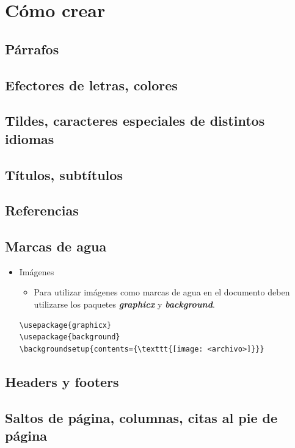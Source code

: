 \documentclass[10pt,journal,compsoc]{IEEEtran}
\begin{document}
\renewcommand{\thesubsection}{\thesection.\alph{subsection}}

\section{C\'omo crear}
	\subsection{P\'arrafos}	
	\subsection{Efectores de letras, colores}
	\subsection{Tildes, caracteres especiales de distintos idiomas}
	\subsection{T\'itulos, subt\'itulos}
	\subsection{Referencias}
	\subsection{Marcas de agua}
	\begin{itemize}
		\item Im\'agenes
		\begin{itemize}
			\item Para utilizar im\'agenes como marcas de agua en el documento deben utilizarse los paquetes \textbf{\textit{graphicx}} y \textbf{\textit{background}}.	
		\end{itemize}
	\begin{lstlisting}
\usepackage{graphicx}
\usepackage{background}
\backgroundsetup{contents={\texttt{[image: <archivo>]}}}
	\end{lstlisting}

	\end{itemize}
	


	\subsection{Headers y footers}
	\subsection{Saltos de p\'agina, columnas, citas al pie de p\'agina}
\end{document}
